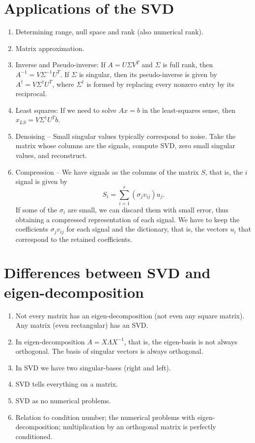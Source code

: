 \documentclass{article}
\begin{document}
\section{Applications of the SVD}
\begin{enumerate}
\item Determining range, null space and rank (also numerical rank).
\item Matrix approximation.
\item Inverse and Pseudo-inverse: If $A=U \Sigma V^{T}$ and $\Sigma$
is full rank, then $A^{-1}=V \Sigma^{-1} U^{T}$. If $\Sigma$ is
singular, then its pseudo-inverse is given by $A^{\dagger}=V
\Sigma^{\dagger} U^{T}$, where $\Sigma^{\dagger}$ is formed by
replacing every nonzero entry by its reciprocal.
\item Least squares: If we need to solve $Ax=b$ in the least-squares
sense, then $x_{LS}=V \Sigma^{\dagger} U^{T} b$.
\item Denoising -- Small singular values typically correspond to
noise. Take the matrix whose columns are the signals, compute SVD,
zero small singular values, and reconstruct.
\item Compression -- We have signals as the columns of the matrix
$S$, that is, the $i$ signal is given by
\begin{equation*}
S_{i} = \sum_{i=1}^{r} \left ( \sigma_{j} v_{ij} \right ) u_{j}.
\end{equation*}
If some of the $\sigma_{i}$ are small, we can discard them with
small error, thus obtaining a compressed representation of each
signal. We have to keep the coefficients $\sigma_{j} v_{ij}$ for
each signal and the dictionary, that is, the vectors $u_{i}$ that
correspond to the retained coefficients.
\end{enumerate}


\section{Differences between SVD and eigen-decomposition}
\begin{enumerate}
\item Not every matrix has an eigen-decomposition (not even any
square matrix).  Any matrix (even rectangular) has an SVD.
\item In eigen-decomposition $A=X \Lambda X^{-1}$, that is, the
eigen-basis is not always orthogonal. The basis of singular vectors
is always orthogonal.
\item In SVD we have two singular-bases (right and left).
\item SVD tells everything on a matrix.
\item SVD as no numerical problems.
\item Relation to condition number; the numerical problems with
eigen-decomposition; multiplication by an orthogonal matrix is
perfectly conditioned.
\end{enumerate}
\end{document}
